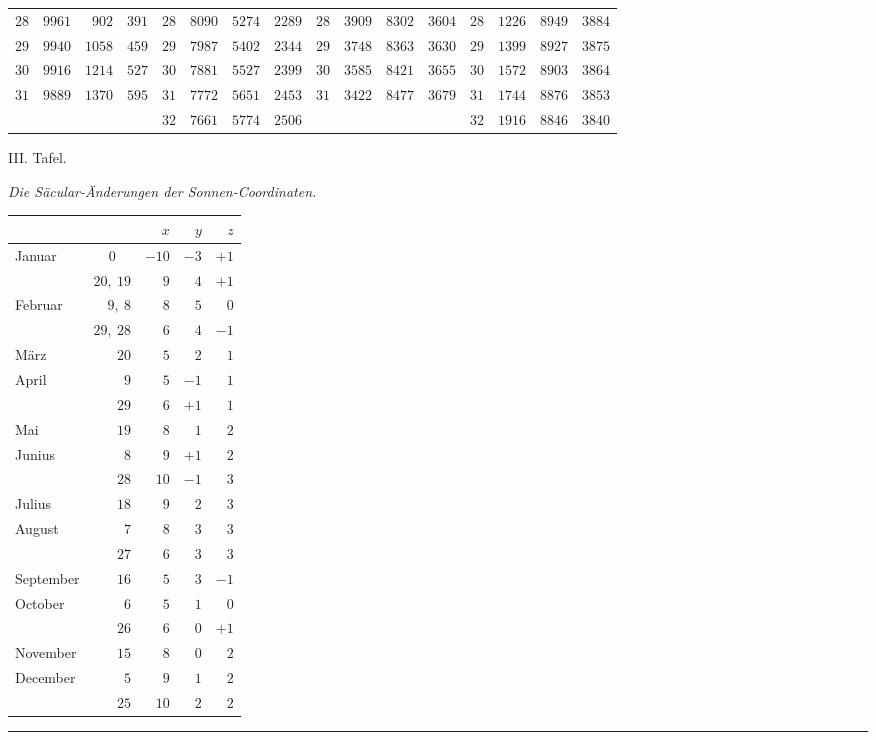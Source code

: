 \begin{GaussVISolarFrame}
\begin{tabular}{r|r|r|r||r|r|r|r||r|r|r|r||r|r|r|r}
$28$ & $9961$ & $902$ & $391$ & $28$ & $8090$ & $5274$ & $2289$ & $28$ & $3909$ & $8302$ & $3604$ & $28$ & $1226$ & $8949$ & $3884$\\
$29$ & $9940$ & $1058$ & $459$ & $29$ & $7987$ & $5402$ & $2344$ & $29$ & $3748$ & $8363$ & $3630$ & $29$ & $1399$ & $8927$ & $3875$\\
$30$ & $9916$ & $1214$ & $527$ & $30$ & $7881$ & $5527$ & $2399$ & $30$ & $3585$ & $8421$ & $3655$ & $30$ & $1572$ & $8903$ & $3864$\\[3pt]
$31$ & $9889$ & $1370$ & $595$ & $31$ & $7772$ & $5651$ & $2453$ & $31$ & $3422$ & $8477$ & $3679$ & $31$ & $1744$ & $8876$ & $3853$\\
 &  &  &  & $32$ & $7661$ & $5774$ & $2506$ &  &  &  &  & $32$ & $1916$ & $8846$ & $3840$\\
\end{tabular}\endgroup
\end{GaussVISolarFrame}
\GaussVIGathering{}{23\textsuperscript{*}}
\par\clearpage
\thispagestyle{empty}
\noindent{}%
\par\nobreak\smallskip
\begin{center}
{\large III. Tafel.\par}
\smallskip
{\large\itshape Die Säcular-Änderungen der Sonnen-Coordinaten.\par}
\medskip
{\setlength{\tabcolsep}{9pt}
\begin{tabular}{lr|r|r|r}
&&$x$&$y$&$z$\\\hline
Januar &\multicolumn{1}{c|}{$0$}&$-10$&$-3$&$+1$\\
&$20,\ 19$&$9$&$4$&$+1$\\
Februar &$9,\ 8$&$8$&$5$&$0$\\
&$29,\ 28$&$6$&$4$&$-1$\\
März &$20$&$5$&$2$&$1$\\
April &$9$&$5$&$-1$&$1$\\
&$29$&$6$&$+1$&$1$\\
Mai &$19$&$8$&$1$&$2$\\
Junius &$8$&$9$&$+1$&$2$\\
&$28$&$10$&$-1$&$3$\\
Julius &$18$&$9$&$2$&$3$\\
August &$7$&$8$&$3$&$3$\\
&$27$&$6$&$3$&$3$\\
September &$16$&$5$&$3$&$-1$\\
October &$6$&$5$&$1$&$0$\\
&$26$&$6$&$0$&$+1$\\
November &$15$&$8$&$0$&$2$\\
December &$5$&$9$&$1$&$2$\\
&$25$&$10$&$2$&$2$
\end{tabular}}
\par
\vspace{2.5\baselineskip}
\rule{.23\linewidth}{.35pt}
\end{center}
\par\clearpage
\endgroup
